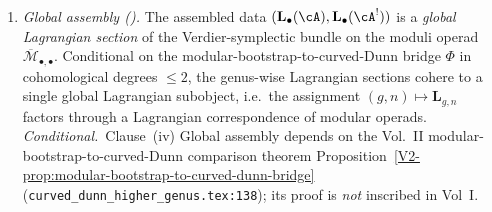 \begin{theorem}
\begin{enumerate}[label=\textup{(\roman*)}]
\[\]
with $R(z)$ the spectral $R$-matrix of Theorem~H. An analogous
identity holds for non-separating clutching via the annular bar
model $B^{\mathrm{ann}}$.
\item \emph{Global assembly \textup{(}\ClaimStatusConditional\textup{)}.}
The assembled data $(\mathbf{L}_{\bullet}(\cA),\mathbf{L}_{\bullet}(\cA^!))$
is a \emph{global Lagrangian section} of the Verdier-symplectic bundle
on the moduli operad $\overline{\mathcal{M}}_{\bullet,\bullet}$.
Conditional on the modular-bootstrap-to-curved-Dunn bridge
$\Phi$ in cohomological degrees $\leq 2$, the genus-wise
Lagrangian sections cohere to a single global Lagrangian subobject,
i.e.\ the assignment $(g,n)\mapsto\mathbf{L}_{g,n}$ factors through
a Lagrangian correspondence of modular operads.
\emph{Conditional.}~Clause~\textup{(iv)} Global assembly depends on
the Vol.~II modular-bootstrap-to-curved-Dunn comparison theorem
Proposition~\ref{V2-prop:modular-bootstrap-to-curved-dunn-bridge}
\textup{(}\texttt{curved\_dunn\_higher\_genus.tex:138}\textup{)};
its proof is \emph{not} inscribed in Vol~I.
\end{enumerate}
\end{theorem}

